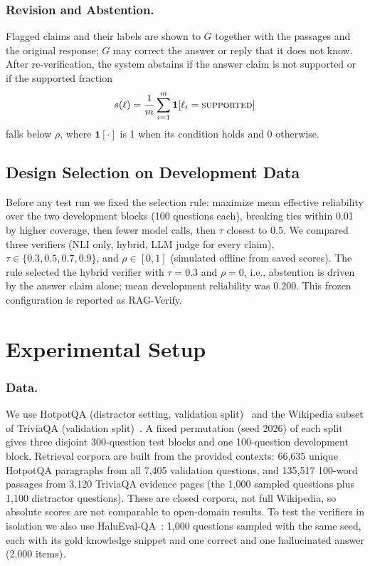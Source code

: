\documentclass{svproc}
\begin{document}
\subsubsection{Revision and Abstention.} Flagged claims and their labels are shown to $G$ together with the passages and the original response; $G$ may correct the answer or reply that it does not know. After re-verification, the system abstains if the answer claim is not supported or if the supported fraction
\begin{equation}
s(\ell)=\frac{1}{m}\sum_{i=1}^{m}\mathbf{1}[\ell_i=\textsc{supported}]
\end{equation}
falls below $\rho$, where $\mathbf{1}[\cdot]$ is 1 when its condition holds and 0 otherwise.

\subsection{Design Selection on Development Data}
Before any test run we fixed the selection rule: maximize mean effective reliability over the two development blocks (100 questions each), breaking ties within 0.01 by higher coverage, then fewer model calls, then $\tau$ closest to 0.5. We compared three verifiers (NLI only, hybrid, LLM judge for every claim), $\tau\in\{0.3,0.5,0.7,0.9\}$, and $\rho\in[0,1]$ (simulated offline from saved scores). The rule selected the hybrid verifier with $\tau=0.3$ and $\rho=0$, i.e., abstention is driven by the answer claim alone; mean development reliability was 0.200. This frozen configuration is reported as RAG-Verify.

\section{Experimental Setup}\label{sec:setup}
\subsubsection{Data.} We use HotpotQA (distractor setting, validation split)~\cite{yang2018hotpotqa} and the Wikipedia subset of TriviaQA (validation split)~\cite{joshi2017triviaqa}. A fixed permutation (seed 2026) of each split gives three disjoint 300-question test blocks and one 100-question development block. Retrieval corpora are built from the provided contexts: 66{,}635 unique HotpotQA paragraphs from all 7{,}405 validation questions, and 135{,}517 100-word passages from 3{,}120 TriviaQA evidence pages (the 1{,}000 sampled questions plus 1{,}100 distractor questions). These are closed corpora, not full Wikipedia, so absolute scores are not comparable to open-domain results. To test the verifiers in isolation we also use HaluEval-QA~\cite{li2023halueval}: 1{,}000 questions sampled with the same seed, each with its gold knowledge snippet and one correct and one hallucinated answer (2{,}000 items).
\end{document}
